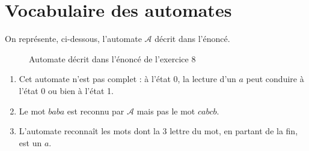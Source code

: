 \section{Vocabulaire des automates}

On représente, ci-dessous, l'automate $\mathcal{A}$\/ décrit dans l'énoncé.
\begin{figure}[H]
	\centering
	\caption{Automate décrit dans l'énoncé de l'exercice 8}
\end{figure}

\begin{enumerate}
	\item Cet automate n'est pas complet : à l'état 0, la lecture d'un $a$\/ peut conduire à l'état 0 ou bien à l'état 1.
	\item Le mot $baba$\/ est reconnu par $\mathcal{A}$\/ mais pas le mot $cabcb$.
	\item L'automate reconnaît les mots dont la 3 lettre du mot, en partant de la fin, est un $a$.
\end{enumerate}


